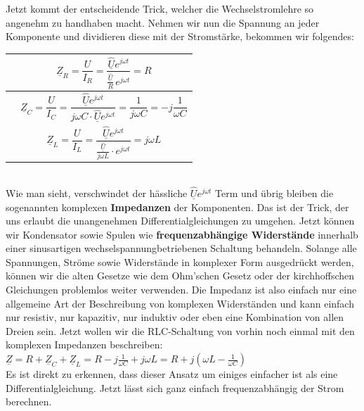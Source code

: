 \documentclass{article}
\begin{document}
\begin{mdframed}
\justify
\vspace{0.2\baselineskip}
Jetzt kommt der entscheidende Trick, welcher die Wechselstromlehre so angenehm zu handhaben macht. Nehmen wir nun die Spannung an jeder Komponente und dividieren diese mit der Stromstärke, bekommen wir folgendes:
\justify
\centering
\begin{tabular}{|p{}>{\raggedright\arraybackslash}p{}|}
    \hline
    \raisebox{-3.2\height}{} & \Large \[\underline{Z}_R = \frac{U}{I_R} = \frac{\underline{\hat{U}} e^{j\omega t}}{\frac{\underline{\hat{U}}}{R} \, e^{j\omega t}} = R\]\\\hline
    \raisebox{-2.2\height}{} & \Large \[\underline{Z}_C = \frac{U}{I_C} = \frac{\underline{\hat{U}} e^{j\omega t}}{j \omega C \cdot \underline{\hat{U}} e^{j\omega t}} = \frac{1}{j \omega C} = -j \frac{1}{\omega C}\]\\\hline
    \raisebox{-2.8\height}{} & \Large \[\underline{Z}_L = \frac{U}{I_L} = \frac{\underline{\hat{U}} e^{j\omega t}}{\frac{\underline{\hat{U}}}{j \omega L} \cdot e^{j \omega t}} = j \omega L\]\\\hline
\end{tabular}\\
\justify
Wie man sieht, verschwindet der hässliche $\underline{\hat{U}} e^{j\omega t}$ Term und übrig bleiben die sogenannten komplexen \textbf{Impedanzen} der Komponenten. Das ist der Trick, der uns erlaubt die unangenehmen Differentialgleichungen zu umgehen. Jetzt können wir Kondensator sowie Spulen wie \textbf{frequenzabhängige Widerstände} innerhalb einer sinusartigen wechselspannungbetriebenen Schaltung behandeln. Solange alle Spannungen, Ströme sowie Widerstände in komplexer Form ausgedrückt werden, können wir die alten Gesetze wie dem Ohm'schen Gesetz oder der kirchhoffschen Gleichungen problemlos weiter verwenden. Die Impedanz ist also einfach nur eine allgemeine Art der Beschreibung von komplexen Widerständen und kann einfach nur resistiv, nur kapazitiv, nur induktiv oder eben eine Kombination von allen Dreien sein. Jetzt wollen wir die RLC-Schaltung von vorhin noch einmal mit den komplexen Impedanzen beschreiben:
\justify
\centering
\raisebox{-0.2\height}{}
\hspace{1\baselineskip}
$\underline{Z} = R + \underline{Z}_C + \underline{Z}_L = R - j\frac{1}{\omega C} + j\omega L = R + j(\omega L - \frac{1}{\omega C})$\\
\justify
Es ist direkt zu erkennen, dass dieser Ansatz um einiges einfacher ist als eine Differentialgleichung. Jetzt lässt sich ganz einfach frequenzabhängig der Strom berechnen. \\

\end{mdframed}
\end{document}
